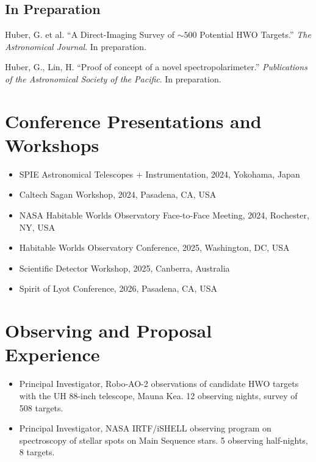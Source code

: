 \documentclass[11pt,letterpaper]{article}
\newcommand{\publication}[4]{%
  \item #1. ``#2.'' \textit{#3}. #4.
}
\begin{document}
\subsection*{In Preparation}
\begin{enumerate}[leftmargin=*, label={[IP\arabic*]}]
  \publication{Huber, G. et al}{A Direct-Imaging Survey of $\sim500$ Potential HWO Targets}{The Astronomical Journal}{In preparation}
  \publication{Huber, G., Lin, H}{Proof of concept of a novel spectropolarimeter}{Publications of the Astronomical Society of the Pacific}{In preparation}
\end{enumerate}







\section{Conference Presentations and Workshops}

\begin{itemize}
  \item SPIE Astronomical Telescopes + Instrumentation, 2024, Yokohama, Japan
  \item Caltech Sagan Workshop, 2024, Pasadena, CA, USA
  \item NASA Habitable Worlds Observatory Face-to-Face Meeting, 2024, Rochester, NY, USA
  \item Habitable Worlds Observatory Conference, 2025, Washington, DC, USA
  \item Scientific Detector Workshop, 2025, Canberra, Australia
  \item Spirit of Lyot Conference, 2026, Pasadena, CA, USA
\end{itemize}







\section{Observing and Proposal Experience}
\begin{itemize}
    \item Principal Investigator, Robo-AO-2 observations of candidate HWO targets with the UH 88-inch telescope, Mauna Kea. 12 observing nights, survey of 508 targets.
  \item Principal Investigator, NASA IRTF/iSHELL observing program on spectroscopy of stellar spots on Main Sequence stars. 5 observing half-nights, 8 targets.
\end{itemize}
\end{document}
